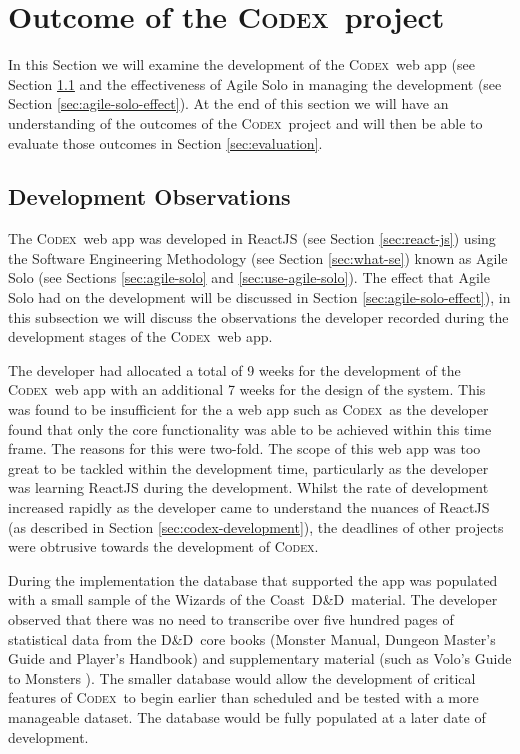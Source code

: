 \documentclass[final]{cmpreport}
\newcommand{\WotC}{Wizards of the Coast}
\newcommand{\dnd}{D\&D}
\newcommand{\Codex}{\textsc{Codex}}
\begin{document}
	\section{Outcome of the \Codex \ project} \label{sec:outcomes}
	In this Section we will examine the development of the \Codex \ web app (see Section \ref{sec:dev-obs} and the effectiveness of Agile Solo in managing the development (see Section \ref{sec:agile-solo-effect}). At the end of this section we will have an understanding of the outcomes of the \Codex \ project and will then be able to evaluate those outcomes in Section \ref{sec:evaluation}.
	
		\subsection{Development Observations} \label{sec:dev-obs}
		The \Codex \ web app was developed in ReactJS (see Section \ref{sec:react-js}) using the Software Engineering Methodology (see Section \ref{sec:what-se}) known as Agile Solo (see Sections \ref{sec:agile-solo} and \ref{sec:use-agile-solo}). The effect that Agile Solo had on the development will be discussed in Section \ref{sec:agile-solo-effect}), in this subsection we will discuss the observations the developer recorded during the development stages of the \Codex \ web app. 
		
		The developer had allocated a total of 9 weeks for the development of the \Codex \ web app with an additional 7 weeks for the design of the system. This was found to be insufficient for the a web app such as \Codex \ as the developer found that only the core functionality was able to be achieved within this time frame. The reasons for this were two-fold. The scope of this web app was too great to be tackled within the development time, particularly as the developer was learning ReactJS during the development. Whilst the rate of development increased rapidly as the developer came to understand the nuances of ReactJS (as described in Section \ref{sec:codex-development}), the deadlines of other projects were obtrusive towards the development of \Codex. 
		
		During the implementation the database that supported the app was populated with a small sample of the \WotC \ \dnd \ material. The developer observed that there was no need to transcribe over five hundred pages of statistical data from the \dnd \ core books (Monster Manual, Dungeon Master's Guide and Player's Handbook) and supplementary material (such as Volo's Guide to Monsters \citep{Volo}). The smaller database would allow the development of critical features of \Codex \ to begin earlier than scheduled and be tested with a more manageable dataset. The database would be fully populated at a later date of development. 
		
\end{document}
